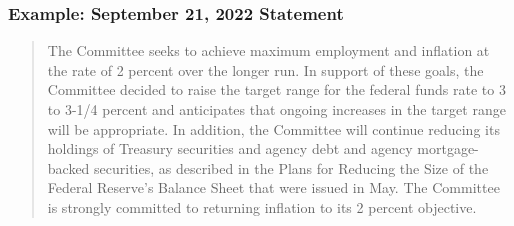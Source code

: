 \documentclass[english,xcolor=svgnames]{beamer}
\begin{document}
\begin{frame}
\frametitle{Example: September 21, 2022 Statement}
\begin{quotation}
The Committee seeks to achieve maximum employment and inflation at the rate of 2 percent over the longer run. In support of these goals, the Committee decided to raise the target range for the federal funds rate to 3 to 3-1/4 percent and anticipates that ongoing increases in the target range will be appropriate. In addition, the Committee will continue reducing its holdings of Treasury securities and agency debt and agency mortgage-backed securities, as described in the Plans for Reducing the Size of the Federal Reserve's Balance Sheet that were issued in May. The Committee is strongly committed to returning inflation to its 2 percent objective.
\end{quotation}
\end{frame}





%
%
\end{document}
